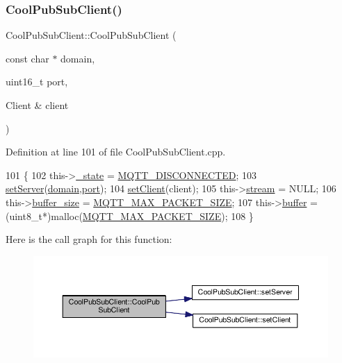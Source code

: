 \subsubsection{\texorpdfstring{Cool\+Pub\+Sub\+Client()}{CoolPubSubClient()}\hspace{0.1cm}{\footnotesize\ttfamily [11/14]}}
{\footnotesize\ttfamily Cool\+Pub\+Sub\+Client\+::\+Cool\+Pub\+Sub\+Client (\begin{DoxyParamCaption}\item[{const char $\ast$}]{domain,  }\item[{uint16\+\_\+t}]{port,  }\item[{Client \&}]{client }\end{DoxyParamCaption})}



Definition at line 101 of file Cool\+Pub\+Sub\+Client.\+cpp.


\begin{DoxyCode}
101                                                                                     \{
102     this->\hyperlink{class_cool_pub_sub_client_aa1953b601206252a30efa5b114eb3e1a}{\_state} = \hyperlink{_cool_pub_sub_client_8h_adaf86a906a305dd129164982d50111b3}{MQTT\_DISCONNECTED};
103     \hyperlink{class_cool_pub_sub_client_a947e70c394c66c7d08d0c53caf8425e3}{setServer}(\hyperlink{class_cool_pub_sub_client_a08d3a5619724f3408ad406ca4fb776e1}{domain},\hyperlink{class_cool_pub_sub_client_a01e3249102c057756af7a515c179844e}{port});
104     \hyperlink{class_cool_pub_sub_client_a7ee119b786010561ab6a9afa0798e91d}{setClient}(client);
105     this->\hyperlink{class_cool_pub_sub_client_a7a92417b317e7bd9502ed37752111705}{stream} = NULL;
106     this->\hyperlink{class_cool_pub_sub_client_ae6cb10e42c057483d53516ac830ab526}{buffer\_size} = \hyperlink{_cool_pub_sub_client_8h_ae09b594688a59f1427c7e45259e039b9}{MQTT\_MAX\_PACKET\_SIZE};
107     this->\hyperlink{class_cool_pub_sub_client_a7e8bcc6096626916046a51bebadc7851}{buffer} = (uint8\_t*)malloc(\hyperlink{_cool_pub_sub_client_8h_ae09b594688a59f1427c7e45259e039b9}{MQTT\_MAX\_PACKET\_SIZE});
108 \}
\end{DoxyCode}
Here is the call graph for this function\+:\nopagebreak
\begin{figure}[H]
\begin{center}
\leavevmode
\includegraphics[width=350pt]{d8/d4b/class_cool_pub_sub_client_a469eefe7429f0cbb6d7d443b52488411_cgraph}
\end{center}
\end{figure}
\mbox{\label{class_cool_pub_sub_client_a103e7286407babde84d63bb735c4e4b6}} 
